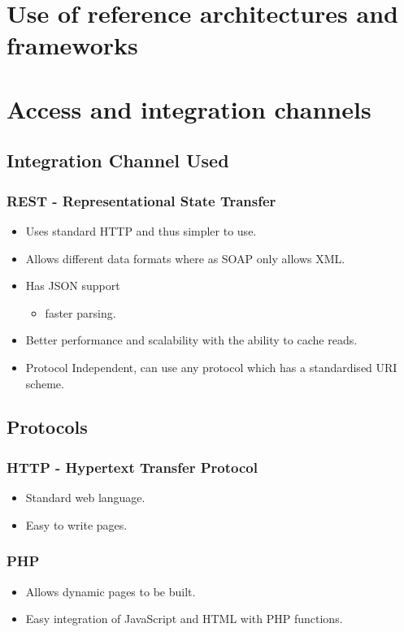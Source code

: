 \documentclass[12pt, oneside]{article}
\begin{document}
\section{Use of reference architectures and frameworks}
\newpage
\section{Access and integration channels}
	\subsection{Integration Channel Used}
		\subsubsection{REST - Representational State Transfer}
		\begin{itemize}
			\item Uses standard HTTP and thus simpler to use.
		 	\item Allows different data formats where as SOAP only allows XML.
			\item Has JSON support
				\begin{itemize}
					\item faster parsing.				
				\end{itemize}			 
			\item Better performance and scalability with the ability to cache reads.
			\item Protocol Independent, can use any protocol which has a standardised URI scheme.		
		\end{itemize}
	\subsection{Protocols}
		\subsubsection{HTTP - Hypertext Transfer Protocol}
			\begin{itemize}
				\item Standard web language.
				\item Easy to write pages.
			\end{itemize}
		\subsubsection{PHP}
			\begin{itemize}
				\item Allows dynamic pages to be built.
				\item Easy integration of JavaScript and HTML with PHP functions.
			\end{itemize}
\end{document}
